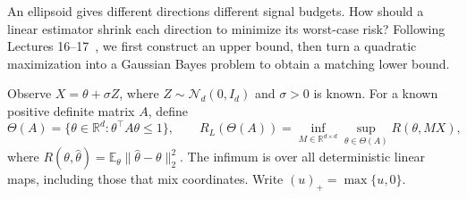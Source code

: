 An ellipsoid gives different directions different signal budgets. How should a linear estimator shrink
each direction to minimize its worst-case risk? Following Lectures 16--17~\cite{wei2026stat9700}, we first construct an upper
bound, then turn a quadratic maximization into a Gaussian Bayes problem to obtain a matching lower
bound.

Observe $X=\theta+\sigma Z$, where $Z\sim\mathcal N_d(0,I_d)$ and $\sigma>0$ is known. For a known positive definite matrix $A$, define
\[
 \Theta(A)=\{\theta\in\mathbb R^d:\theta^\top A\theta\le1\},\qquad
 R_L(\Theta(A))=\inf_{M\in\mathbb R^{d\times d}}\sup_{\theta\in\Theta(A)}R(\theta,MX),
\]
where $R(\theta,\hat\theta)=\mathbb E_\theta\|\hat\theta-\theta\|_2^2$. The infimum is over all deterministic linear maps, including those that mix coordinates. Write $(u)_+=\max\{u,0\}$.

